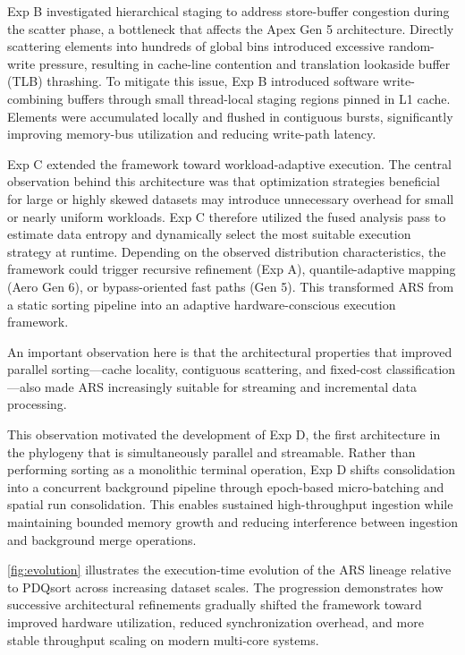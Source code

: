Exp B investigated hierarchical staging to address store-buffer congestion during the scatter phase, a bottleneck that affects the Apex Gen 5 architecture.
Directly scattering elements into hundreds of global bins introduced excessive random-write pressure, resulting in cache-line contention and translation lookaside buffer (TLB) thrashing.
To mitigate this issue, Exp B introduced software write-combining buffers through small thread-local staging regions pinned in L1 cache.
Elements were accumulated locally and flushed in contiguous bursts, significantly improving memory-bus utilization and reducing write-path latency.

Exp C extended the framework toward workload-adaptive execution.
The central observation behind this architecture was that optimization strategies beneficial for large or highly skewed datasets may introduce unnecessary overhead for small or nearly uniform workloads.
Exp C therefore utilized the fused analysis pass to estimate data entropy and dynamically select the most suitable execution strategy at runtime.
Depending on the observed distribution characteristics, the framework could trigger recursive refinement (Exp A), quantile-adaptive mapping (Aero Gen 6), or bypass-oriented fast paths (Gen 5).
This transformed ARS from a static sorting pipeline into an adaptive hardware-conscious execution framework.

An important observation here is that the architectural properties that improved parallel sorting---cache locality, contiguous scattering, and fixed-cost classification---also made ARS increasingly suitable for streaming and incremental data processing.

This observation motivated the development of Exp D, the first architecture in the phylogeny that is simultaneously parallel and streamable.
Rather than performing sorting as a monolithic terminal operation, Exp D shifts consolidation into a concurrent background pipeline through epoch-based micro-batching and spatial run consolidation. 
This enables sustained high-throughput ingestion while maintaining bounded memory growth and reducing interference between ingestion and background merge operations.

\cref{fig:evolution} illustrates the execution-time evolution of the ARS lineage relative to PDQsort across increasing dataset scales. 
The progression demonstrates how successive architectural refinements gradually shifted the framework toward improved hardware utilization, reduced synchronization overhead, and more stable throughput scaling on modern multi-core systems.

